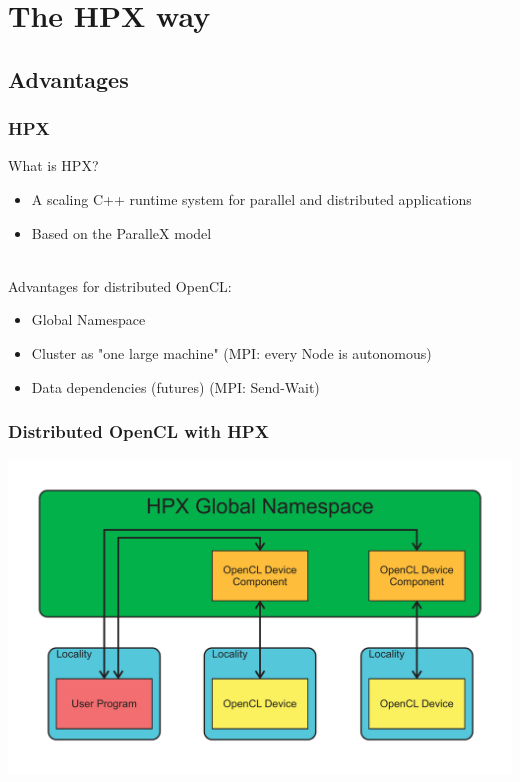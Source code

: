 \documentclass{beamer}
\begin{document}
\section{The HPX way}

\subsection{Advantages}
\begin{frame}
    \frametitle{HPX}
    What is HPX?
    \begin{itemize}
        \item A scaling C++ runtime system for parallel and distributed applications
        \item Based on the ParalleX model
    \end{itemize}
    ~\\
    Advantages for distributed OpenCL:
    \begin{itemize}
        \item Global Namespace
        \item Cluster as "one large machine" (MPI: every Node is autonomous)
        \item Data dependencies (futures) (MPI: Send-Wait)
    \end{itemize}
\end{frame}

\begin{frame}
    \frametitle{Distributed OpenCL with HPX}
    \includegraphics[width=\textwidth]{../2014-09-25_gputalk/hpx_opencl.pdf}
\end{frame}
\end{document}
